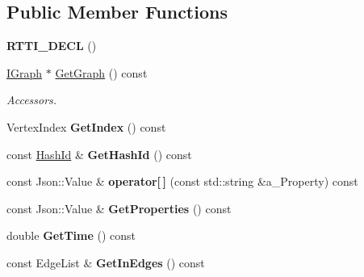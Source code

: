 \subsection*{Public Member Functions}
\begin{DoxyCompactItemize}
\item 
\mbox{\label{class_i_graph_1_1_i_vertex_ab67dad14501e037dc0cdf423e3d85679}} 
{\bfseries R\+T\+T\+I\+\_\+\+D\+E\+CL} ()
\item 
\mbox{\label{class_i_graph_1_1_i_vertex_a1333d1efdd907b605d4a87329f9c63cf}} 
\hyperlink{class_i_graph}{I\+Graph} $\ast$ \hyperlink{class_i_graph_1_1_i_vertex_a1333d1efdd907b605d4a87329f9c63cf}{Get\+Graph} () const
\begin{DoxyCompactList}\small\item\em Accessors. \end{DoxyCompactList}\item 
\mbox{\label{class_i_graph_1_1_i_vertex_a6e7d9eb6b6a713a2093ccb0cff1ff644}} 
Vertex\+Index {\bfseries Get\+Index} () const
\item 
\mbox{\label{class_i_graph_1_1_i_vertex_ae40b3e2c59776d90c16ea1a25bc41d8d}} 
const \hyperlink{class_i_graph_a27d53eee7b0a7abc9fce6c28983d5446}{Hash\+Id} \& {\bfseries Get\+Hash\+Id} () const
\item 
\mbox{\label{class_i_graph_1_1_i_vertex_aa7e8c6bf3fed2214f340da58fb587065}} 
const Json\+::\+Value \& {\bfseries operator\mbox{[}$\,$\mbox{]}} (const std\+::string \&a\+\_\+\+Property) const
\item 
\mbox{\label{class_i_graph_1_1_i_vertex_a7eb322edccc5fd51c9852a48f19407e7}} 
const Json\+::\+Value \& {\bfseries Get\+Properties} () const
\item 
\mbox{\label{class_i_graph_1_1_i_vertex_ab8d4d62e7d39fbd37bcc5cb9ec6a0535}} 
double {\bfseries Get\+Time} () const
\item 
\mbox{\label{class_i_graph_1_1_i_vertex_accc3c41ceb133fbccbcf9816e8a37382}} 
const Edge\+List \& {\bfseries Get\+In\+Edges} () const

\end{DoxyCompactItemize}
